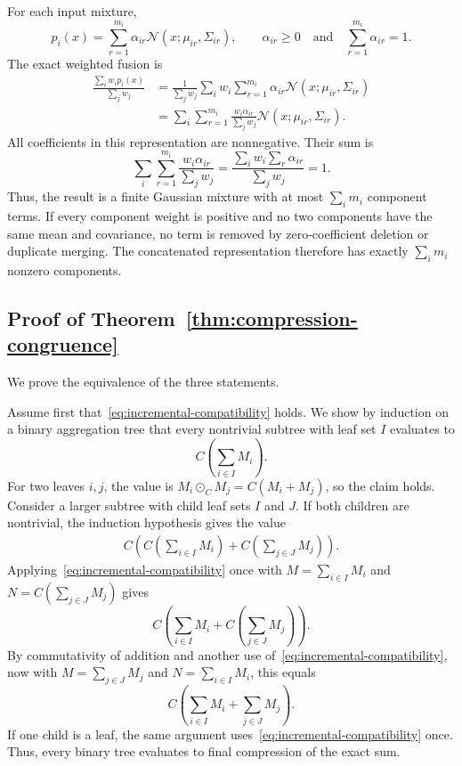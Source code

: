 \documentclass[runningheads]{llncs}
\newcommand{\N}{\mathcal{N}}
\begin{document}
For each input mixture,
\begin{equation*}
  p_i(x)=\sum_{r=1}^{m_i}\alpha_{ir}\N(x;\mu_{ir},\Sigma_{ir}),
  \qquad
  \alpha_{ir}\ge0
  \quad\text{and}\quad
  \sum_{r=1}^{m_i}\alpha_{ir}=1.
\end{equation*}
The exact weighted fusion is
\begin{align*}
  \frac{\sum_iw_ip_i(x)}{\sum_jw_j}
  &=\frac{1}{\sum_jw_j}\sum_iw_i\sum_{r=1}^{m_i}\alpha_{ir}\N(x;\mu_{ir},\Sigma_{ir})\\
  &=\sum_i\sum_{r=1}^{m_i}\frac{w_i\alpha_{ir}}{\sum_jw_j}\N(x;\mu_{ir},\Sigma_{ir}).
\end{align*}
All coefficients in this representation are nonnegative. Their sum is
\begin{equation*}
  \sum_i\sum_{r=1}^{m_i}\frac{w_i\alpha_{ir}}{\sum_jw_j}
  =\frac{\sum_iw_i\sum_r\alpha_{ir}}{\sum_jw_j}
  =1.
\end{equation*}
Thus, the result is a finite Gaussian mixture with at most $\sum_i m_i$ component terms. If every component weight is positive and no two components have the same mean and covariance, no term is removed by zero-coefficient deletion or duplicate merging. The concatenated representation therefore has exactly $\sum_i m_i$ nonzero components.

\subsection*{Proof of Theorem~\ref{thm:compression-congruence}}

We prove the equivalence of the three statements.

Assume first that~\eqref{eq:incremental-compatibility} holds. We show by induction on a binary aggregation tree that every nontrivial subtree with leaf set $I$ evaluates to
\begin{equation*}
  C\!\left(\sum_{i\in I}M_i\right).
\end{equation*}
For two leaves $i,j$, the value is $M_i\odot_C M_j=C(M_i+M_j)$, so the claim holds. Consider a larger subtree with child leaf sets $I$ and $J$. If both children are nontrivial, the induction hypothesis gives the value
\begin{align*}
  C\!\left(C\!\left(\sum_{i\in I}M_i\right)+C\!\left(\sum_{j\in J}M_j\right)\right).
\end{align*}
Applying~\eqref{eq:incremental-compatibility} once with $M=\sum_{i\in I}M_i$ and $N=C(\sum_{j\in J}M_j)$ gives
\begin{equation*}
  C\!\left(\sum_{i\in I}M_i+C\!\left(\sum_{j\in J}M_j\right)\right).
\end{equation*}
By commutativity of addition and another use of~\eqref{eq:incremental-compatibility}, now with $M=\sum_{j\in J}M_j$ and $N=\sum_{i\in I}M_i$, this equals
\begin{equation*}
  C\!\left(\sum_{i\in I}M_i+\sum_{j\in J}M_j\right).
\end{equation*}
If one child is a leaf, the same argument uses~\eqref{eq:incremental-compatibility} once. Thus, every binary tree evaluates to final compression of the exact sum.
\end{document}

